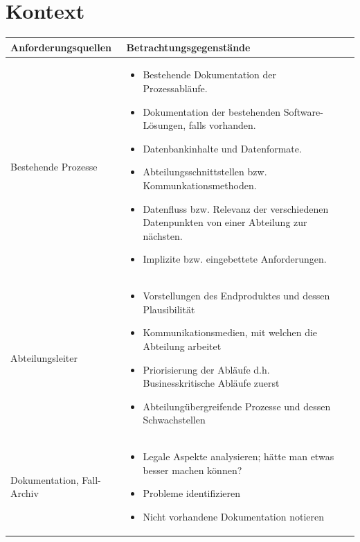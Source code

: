 \section{Kontext}
  \begin{tabular}{| l | l | l|}
    \hline
    \textbf{Anforderungsquellen} & \textbf{Betrachtungsgegenstände} \\ \hline
    Bestehende Prozesse
    &
    {\parbox{0.7\textwidth}{
      \begin{itemize}
        \item Bestehende Dokumentation der Prozessabläufe.
        \item Dokumentation der bestehenden Software-Lösungen, falls vorhanden.
        \item Datenbankinhalte und Datenformate.
        \item Abteilungsschnittstellen bzw. Kommunkationsmethoden.
        \item Datenfluss bzw. Relevanz der verschiedenen Datenpunkten von einer Abteilung zur nächsten.
        \item Implizite bzw. eingebettete Anforderungen.
      \end{itemize}
    }}
    \\ \hline
    Abteilungsleiter
    &
    {\parbox{0.7\textwidth}{
      \begin{itemize}
        \item Vorstellungen des Endproduktes und dessen Plausibilität 
        \item Kommunikationsmedien, mit welchen die Abteilung arbeitet
        \item Priorisierung der Abläufe d.h. Businesskritische Abläufe zuerst
        \item Abteilungübergreifende Prozesse und dessen Schwachstellen
      \end{itemize}
    }}
    \\ \hline    
    Dokumentation, Fall-Archiv
    &
    {\parbox{0.7\textwidth}{
      \begin{itemize}
        \item Legale Aspekte analysieren; hätte man etwas besser machen können? 
        \item Probleme identifizieren
        \item Nicht vorhandene Dokumentation notieren
      \end{itemize}
    }}
    \\ \hline      
  \end{tabular}

